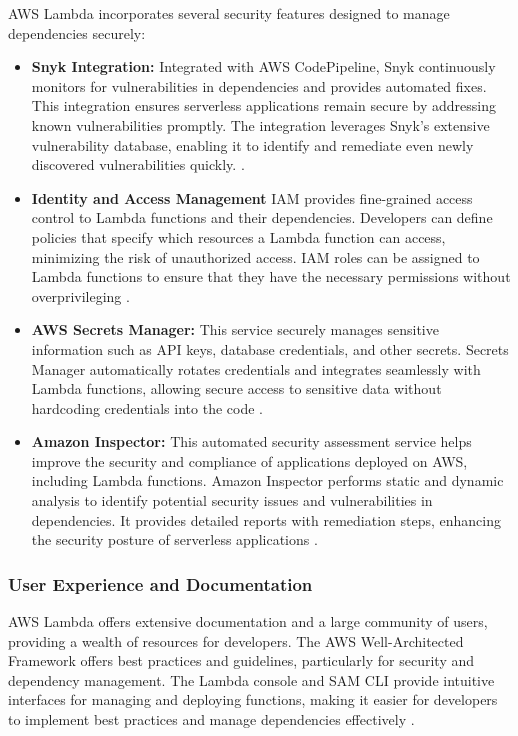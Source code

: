 \documentclass[sigconf]{acmart}
\begin{document}
AWS Lambda incorporates several security features designed to manage dependencies securely:

\begin{itemize}
    \item \textbf{Snyk Integration:} Integrated with AWS CodePipeline, Snyk continuously monitors for vulnerabilities in dependencies and provides automated fixes. This integration ensures serverless applications remain secure by addressing known vulnerabilities promptly. The integration leverages Snyk's extensive vulnerability database, enabling it to identify and remediate even newly discovered vulnerabilities quickly. \cite{snykaws2023}.
    \item \textbf{Identity and Access Management} IAM provides fine-grained access control to Lambda functions and their dependencies. Developers can define policies that specify which resources a Lambda function can access, minimizing the risk of unauthorized access. IAM roles can be assigned to Lambda functions to ensure that they have the necessary permissions without overprivileging \cite{awsSecurity2023}.
    \item \textbf{AWS Secrets Manager:} This service securely manages sensitive information such as API keys, database credentials, and other secrets. Secrets Manager automatically rotates credentials and integrates seamlessly with Lambda functions, allowing secure access to sensitive data without hardcoding credentials into the code \cite{awsSecurity2023}.
    \item \textbf{Amazon Inspector:} This automated security assessment service helps improve the security and compliance of applications deployed on AWS, including Lambda functions. Amazon Inspector performs static and dynamic analysis to identify potential security issues and vulnerabilities in dependencies. It provides detailed reports with remediation steps, enhancing the security posture of serverless applications \cite{awsinspector2023}.
\end{itemize}

\subsubsection{User Experience and Documentation}

AWS Lambda offers extensive documentation and a large community of users, providing a wealth of resources for developers. The AWS Well-Architected Framework offers best practices and guidelines, particularly for security and dependency management. The Lambda console and SAM CLI provide intuitive interfaces for managing and deploying functions, making it easier for developers to implement best practices and manage dependencies effectively \cite{awsWell2023}.
\end{document}
